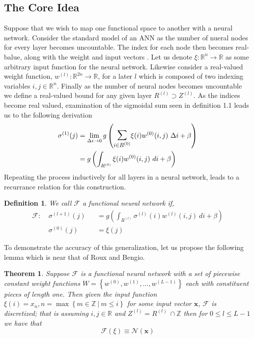 \documentclass{ib-assignment}
\newtheorem{definition}{Definition}[section]
\newtheorem{theorem}{Theorem}
\newcommand{\Sum}{\mathlarger{\mathlarger{\sum}}}
\begin{document}
\subsection{The Core Idea}
Suppose that we wish to map one functional space to another with a neural network. Consider the standard model of an ANN as the number of nueral nodes for every layer becomes uncountable. The index for each node then becomes real-balue, along with the weight and input vectors %
. Let us denote \(\xi: \mathbb{R}^n\to\mathbb{R}\) as some arbitrary input function for the neural network. Likewise consider a real-valued weight function, \(w^{(l)}: \mathbb{R}^{2n}\to\mathbb{R}\), for a later $l$ which is composed of two indexing variables $i,j \in \mathbb{R}^n$. Finally as the number of neural nodes becomes uncountable we define a real-valued bound for any given layer $R^{(l)} \supset Z^{(l)}$.  As the indices become real valued, examination of the sigmoidal sum seen in definition 1.1 leads us to the following derivation
\begin{equation*}
\begin{aligned}
	\sigma^{(1)}(j) &= \lim_{\Delta i \to 0}g\left(\Sum_{i\in R^{(0)}} \xi(i) w^{(0)}(i,j)\ \Delta i + \beta\right) \\
    &= g\left(\int_{R^{(0)}} \xi(i) w^{(0)}(i,j)\ di + \beta\right)
\end{aligned}
\end{equation*}
Repeating the process inductively for all layers in a neural network, leads to a recurrance relation for this construction. 
\begin{definition}
We call $\mathcal{F}$ a functional neural network if,
\begin{equation*}
    	  \begin{alignedat}{2}
        \mathcal{F}:\ &\sigma^{(l+1)}(j) & &=  g\left(\int_{R^{(l)}} \sigma^{(l)}(i) w^{(l)}(i,j)\ di + \beta\right)  \\
        &\sigma^{(0)}(j) & &= \xi(j) 
        \end{alignedat}
\end{equation*}
\end{definition}
To demonstrate the accuracy of this generalization, let us propose the following lemma which is near that of Roux and Bengio.
\begin{theorem} Suppose $\mathcal{F}$ is a functional neural network with a set of piecewise constant weight functions $W = \left\{w^{(0)}, w^{(1)}, \dots, w^{(L-1)}\right\}$ each with constituent pieces of length one. Then given the input function $\xi(i) = x_n, n = \max\left\{m\in \mathbb{Z}\ |\ m\leq i\right\}$ for some input vector $\pmb{x}$, $\mathcal{F}$ is discretized; that is assuming $i,j \in \mathbb{R}$ and $Z^{(l)} = R^{(l)}\ \cap \mathbb{Z}$ then for $0 \leq l \leq L-1$ we have that
$$\mathcal{F}(\xi)\equiv \mathcal{N}(\pmb{x})$$
\end{theorem}
\end{document}
